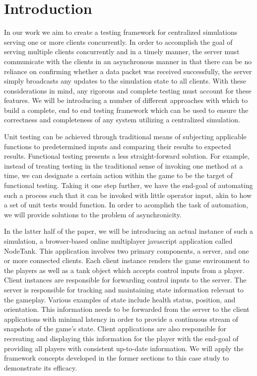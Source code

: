\documentclass[conference]{IEEEtran}
\begin{document}
\section{Introduction}
In our work we aim to create a testing framework for centralized simulations serving one or more clients concurrently. In order to accomplish the goal of serving
multiple clients concurrently and in a timely manner, the server must communicate with the clients in an asynchronous manner in that there can be no reliance
on confirming whether a data packet was received successfully, the server simply broadcasts any updates to the simulation state to all clients. With these considerations
in mind, any rigorous and complete testing must account for these features. We will be introducing a number of different approaches with which to build a complete, end to end
testing framework which can be used to ensure the correctness and completeness of any system utilizing a centralized simulation.

Unit testing can be achieved through traditional means of subjecting applicable functions to predetermined inputs and comparing their results to expected results.
Functional testing presents a less straight-forward solution. For example, instead of treating testing in the traditional sense of invoking one method at a time,
we can designate a certain action within the game to be the target of functional testing. Taking it one step further, we have the end-goal of automating such a process such that
it can be invoked with little operator input, akin to how a set of unit tests would function. In order to acomplish the task of automation, we will provide solutions to the problem
of asynchronicity.

In the latter half of the paper, we will be introducing an actual instance of such a simulation, a browser-based online multiplayer javascript application called NodeTank.
This application involves two primary components, a server, and one or more connected clients. Each client instance renders the game environment to the players as well as a tank object which accepts control inputs from
a player. Client instances are responsible for forwarding control inputs to the server. The server is responsible for tracking and maintaining state information relevant
to the gameplay. Various examples of state include health status, position, and orientation. This information needs to be forwarded from the server to the client applications
with minimal latency in order to provide a continuous stream of snapshots of the game’s state. Client applications are also responsible for recreating and displaying this
information for the player with the end-goal of providing all players with consistent up-to-date information. We will apply the framework concepts developed in the former sections to this
case study to demonstrate its efficacy.
\end{document}

